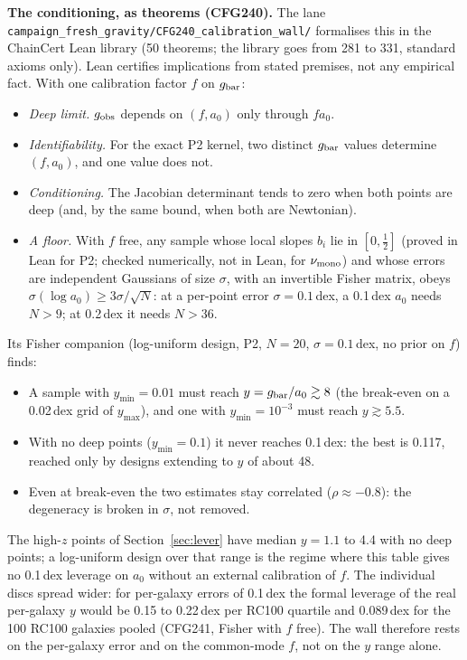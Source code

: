 \documentclass[10pt]{article}
\newcommand{\fpath}[1]{\nolinkurl{#1}}
\begin{document}
\textbf{The conditioning, as theorems (CFG240).} The lane \fpath{campaign_fresh_gravity/CFG240_calibration_wall/} formalises this in the ChainCert Lean library (50 theorems; the library goes from 281 to 331, standard axioms only). Lean certifies implications from stated premises, not any empirical fact. With one calibration factor $f$ on $g_{\rm bar}$:
\begin{itemize}
\item \emph{Deep limit.} $g_{\rm obs}$ depends on $(f,a_0)$ only through $f a_0$.
\item \emph{Identifiability.} For the exact P2 kernel, two distinct $g_{\rm bar}$ values determine $(f,a_0)$, and one value does not.
\item \emph{Conditioning.} The Jacobian determinant tends to zero when both points are deep (and, by the same bound, when both are Newtonian).
\item \emph{A floor.} With $f$ free, any sample whose local slopes $b_i$ lie in $[0,\tfrac12]$ (proved in Lean for P2; checked numerically, not in Lean, for $\nu_{\rm mono}$) and whose errors are independent Gaussians of size $\sigma$, with an invertible Fisher matrix, obeys $\sigma(\log a_0)\ge 3\sigma/\sqrt N$: at a per-point error $\sigma=0.1$\,dex, a 0.1\,dex $a_0$ needs $N>9$; at 0.2\,dex it needs $N>36$.
\end{itemize}
Its Fisher companion (log-uniform design, P2, $N=20$, $\sigma=0.1$\,dex, no prior on $f$) finds:
\begin{itemize}
\item A sample with $y_{\min}=0.01$ must reach $y=g_{\rm bar}/a_0\gtrsim8$ (the break-even on a 0.02\,dex grid of $y_{\max}$), and one with $y_{\min}=10^{-3}$ must reach $y\gtrsim5.5$.
\item With no deep points ($y_{\min}=0.1$) it never reaches 0.1\,dex: the best is 0.117, reached only by designs extending to $y$ of about 48.
\item Even at break-even the two estimates stay correlated ($\rho\approx-0.8$): the degeneracy is broken in $\sigma$, not removed.
\end{itemize}
The high-$z$ points of Section~\ref{sec:lever} have median $y=1.1$ to 4.4 with no deep points; a log-uniform design over that range is the regime where this table gives no 0.1\,dex leverage on $a_0$ without an external calibration of $f$. The individual discs spread wider: for per-galaxy errors of 0.1\,dex the formal leverage of the real per-galaxy $y$ would be 0.15 to 0.22\,dex per RC100 quartile and 0.089\,dex for the 100 RC100 galaxies pooled (CFG241, Fisher with $f$ free). The wall therefore rests on the per-galaxy error and on the common-mode $f$, not on the $y$ range alone.
\end{document}
